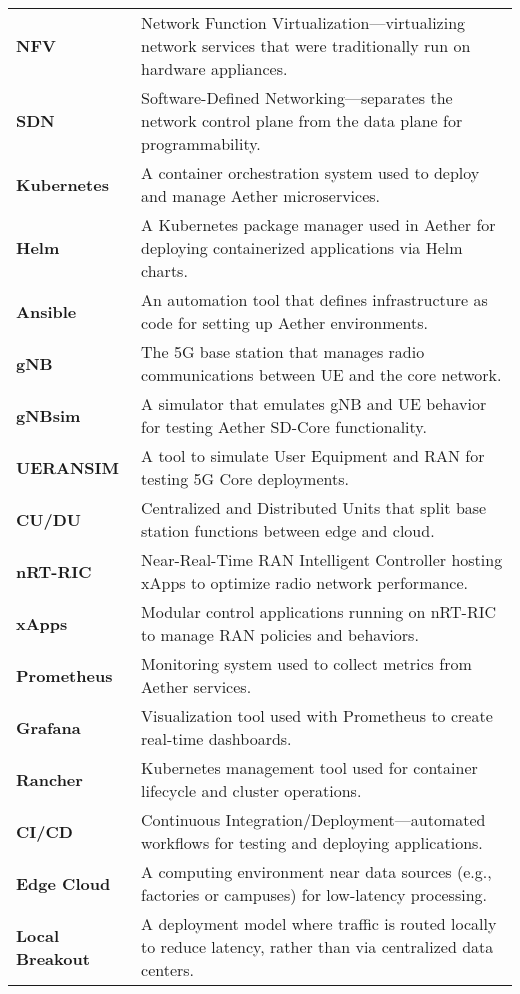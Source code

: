\begin{longtable}{>{\bfseries}p{} p{}}
NFV & Network Function Virtualization—virtualizing network services that were traditionally run on hardware appliances. \\
SDN & Software-Defined Networking—separates the network control plane from the data plane for programmability. \\
Kubernetes & A container orchestration system used to deploy and manage Aether microservices. \\
Helm & A Kubernetes package manager used in Aether for deploying containerized applications via Helm charts. \\
Ansible & An automation tool that defines infrastructure as code for setting up Aether environments. \\
gNB & The 5G base station that manages radio communications between UE and the core network. \\
gNBsim & A simulator that emulates gNB and UE behavior for testing Aether SD-Core functionality. \\
UERANSIM & A tool to simulate User Equipment and RAN for testing 5G Core deployments. \\
CU/DU & Centralized and Distributed Units that split base station functions between edge and cloud. \\
nRT-RIC & Near-Real-Time RAN Intelligent Controller hosting xApps to optimize radio network performance. \\
xApps & Modular control applications running on nRT-RIC to manage RAN policies and behaviors. \\
Prometheus & Monitoring system used to collect metrics from Aether services. \\
Grafana & Visualization tool used with Prometheus to create real-time dashboards. \\
Rancher & Kubernetes management tool used for container lifecycle and cluster operations. \\
CI/CD & Continuous Integration/Deployment—automated workflows for testing and deploying applications. \\
Edge Cloud & A computing environment near data sources (e.g., factories or campuses) for low-latency processing. \\
Local Breakout & A deployment model where traffic is routed locally to reduce latency, rather than via centralized data centers. \\

\end{longtable}
